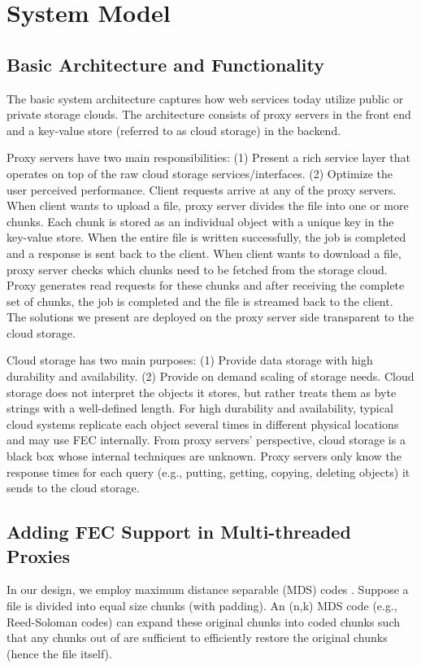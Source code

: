 \documentclass[journal]{IEEEtran}
\begin{document}
\section{System Model}
\label{sec:system}



\subsection{Basic Architecture and Functionality}
The basic system architecture captures how web services today utilize public or private storage clouds.  The architecture consists of proxy servers in the front end and a key-value store (referred to as cloud storage) in the backend. 

Proxy servers have two main responsibilities: (1) Present a rich service layer  that operates on top of the raw cloud storage services/interfaces. (2) Optimize the user perceived performance. Client requests arrive at any of the proxy servers. When client wants to upload a file, proxy server divides the file into one or more chunks. Each chunk is stored as an individual object with a unique key in the key-value store. When the entire file is written successfully, the job is completed and a response is sent back to the client.  When client wants to download a file, proxy server checks which chunks need to be fetched from the storage cloud. Proxy generates read requests for these chunks and after receiving the complete set of chunks, the job is completed and the file is streamed back to the client. The solutions we present are deployed on the proxy server side transparent to the cloud storage.

Cloud storage has two main purposes: (1) Provide data storage with high durability and availability. (2) Provide on demand scaling of storage needs. Cloud storage does not interpret the objects it stores, but rather treats them as byte strings with a well-defined length. For high durability and availability, typical cloud systems replicate each object several times in different physical locations and may use FEC internally. From proxy servers' perspective, cloud storage is a black box whose internal techniques are unknown. Proxy servers only know the response times for each query (e.g., putting, getting, copying, deleting objects) it sends to the cloud storage.

\subsection{Adding FEC Support in Multi-threaded Proxies}
In our design, we employ maximum distance separable (MDS) codes \cite{lincostello}. Suppose a file is divided into  equal size chunks (with padding). An (n,k) MDS code (e.g., Reed-Soloman codes) can expand these  original chunks into  coded chunks such that any  chunks out of  are sufficient to efficiently restore the  original chunks (hence the file itself). 
\end{document}
